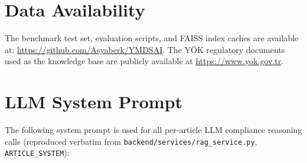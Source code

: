 \documentclass[a4paper,fleqn]{cas-dc}
\begin{document}
\section*{Data Availability}
The benchmark test set, evaluation scripts, and FAISS index caches are
available at: \url{https://github.com/Asyaberk/YMDSAI}.
The YÖK regulatory documents used as the knowledge base are publicly available
at \url{https://www.yok.gov.tr}.




\appendix
\section{LLM System Prompt}
\label{app:prompt}

The following system prompt is used for all per-article LLM compliance reasoning calls
(reproduced verbatim from \texttt{backend/services/rag\_service.py}, \texttt{ARTICLE\_SYSTEM}):
\end{document}
